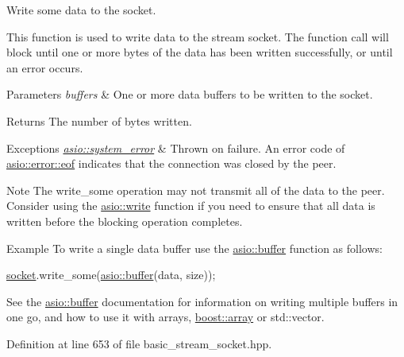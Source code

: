 Write some data to the socket. 

This function is used to write data to the stream socket. The function call will block until one or more bytes of the data has been written successfully, or until an error occurs.


\begin{DoxyParams}{Parameters}
{\em buffers} & One or more data buffers to be written to the socket.\\
\hline
\end{DoxyParams}
\begin{DoxyReturn}{Returns}
The number of bytes written.
\end{DoxyReturn}

\begin{DoxyExceptions}{Exceptions}
{\em \hyperlink{classasio_1_1system__error}{asio\+::system\+\_\+error}} & Thrown on failure. An error code of \hyperlink{namespaceasio_1_1error_ade61a402d1dfb10b1c223906f5ea7847abb0b3b47deff67dd67b180d9d1e34154}{asio\+::error\+::eof} indicates that the connection was closed by the peer.\\
\hline
\end{DoxyExceptions}
\begin{DoxyNote}{Note}
The write\+\_\+some operation may not transmit all of the data to the peer. Consider using the \hyperlink{group__write}{asio\+::write} function if you need to ensure that all data is written before the blocking operation completes.
\end{DoxyNote}
\begin{DoxyParagraph}{Example}
To write a single data buffer use the \hyperlink{group__buffer}{asio\+::buffer} function as follows\+: 
\begin{DoxyCode}
\hyperlink{namespacewebsocketpp_1_1transport_1_1asio_1_1socket_1_1error_a828ddaa5ed63a761e1b557465a35f05aa0c31b356014843e1d09514e794a539a7}{socket}.write\_some(\hyperlink{group__buffer_ga1ed66e401559cbfd19595392f653b47c}{asio::buffer}(data, size));
\end{DoxyCode}
 See the \hyperlink{group__buffer}{asio\+::buffer} documentation for information on writing multiple buffers in one go, and how to use it with arrays, \hyperlink{classboost_1_1array}{boost\+::array} or std\+::vector. 
\end{DoxyParagraph}


Definition at line 653 of file basic\+\_\+stream\+\_\+socket.\+hpp.

\hypertarget{classasio_1_1basic__stream__socket_a6b3873c18a1ce5abf99aa61859ecb058}{}
